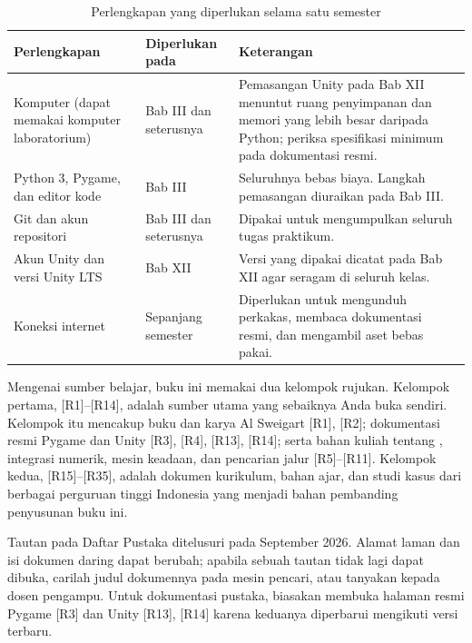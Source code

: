 \begin{table}[htbp]
\centering
\caption{Perlengkapan yang diperlukan selama satu semester}
\label{tab:perlengkapan}
{\setlength{\tabcolsep}{4pt}\footnotesize%
\begin{tabularx}{\textwidth}{@{}L{3.4cm} L{3.6cm} Y@{}}
\toprule
\headrow \textbf{Perlengkapan} & \textbf{Diperlukan pada} & \textbf{Keterangan} \\
\midrule
Komputer (dapat memakai komputer laboratorium) &
Bab III dan seterusnya &
Pemasangan Unity pada Bab XII menuntut ruang penyimpanan dan memori yang lebih
besar daripada Python; periksa spesifikasi minimum pada dokumentasi resmi. \\
\addlinespace
Python 3, Pygame, dan editor kode &
Bab III &
Seluruhnya bebas biaya. Langkah pemasangan diuraikan pada Bab III. \\
\addlinespace
Git dan akun repositori &
Bab III dan seterusnya &
Dipakai untuk mengumpulkan seluruh tugas praktikum. \\
\addlinespace
Akun Unity dan versi Unity LTS &
Bab XII &
Versi yang dipakai dicatat pada Bab XII agar seragam di seluruh kelas. \\
\addlinespace
Koneksi internet &
Sepanjang semester &
Diperlukan untuk mengunduh perkakas, membaca dokumentasi resmi, dan mengambil
aset bebas pakai. \\
\bottomrule
\end{tabularx}}
\end{table}

Mengenai sumber belajar, buku ini memakai dua kelompok rujukan. Kelompok
pertama, \mbox{[R1]}--\mbox{[R14]}, adalah sumber utama yang sebaiknya Anda
buka sendiri. Kelompok itu mencakup buku  dan  karya
Al Sweigart \mbox{[R1]}, \mbox{[R2]}; dokumentasi resmi Pygame dan Unity
\mbox{[R3]}, \mbox{[R4]}, \mbox{[R13]}, \mbox{[R14]}; serta bahan kuliah
tentang , integrasi numerik, mesin keadaan, dan pencarian
jalur \mbox{[R5]}--\mbox{[R11]}. Kelompok kedua,
\mbox{[R15]}--\mbox{[R35]}, adalah dokumen kurikulum, bahan ajar, dan studi
kasus dari berbagai perguruan tinggi Indonesia yang menjadi bahan pembanding
penyusunan buku ini.

\begin{catatabox}
Tautan pada Daftar Pustaka ditelusuri pada September 2026. Alamat laman dan
isi dokumen daring dapat berubah; apabila sebuah tautan tidak lagi dapat
dibuka, carilah judul dokumennya pada mesin pencari, atau tanyakan kepada
dosen pengampu. Untuk dokumentasi pustaka, biasakan membuka halaman resmi
Pygame \mbox{[R3]} dan Unity \mbox{[R13]}, \mbox{[R14]} karena keduanya
diperbarui mengikuti versi terbaru.
\end{catatabox}
